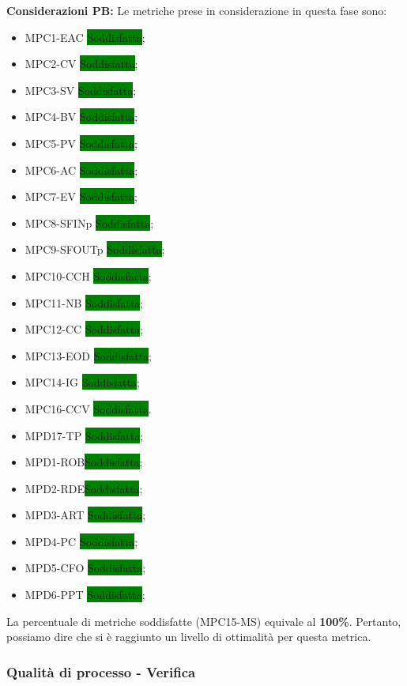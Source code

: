 \bigskip
\noindent \textbf{Considerazioni PB:}
Le metriche prese in considerazione in questa fase sono:
\begin{itemize}
    \item MPC1-EAC \colorbox{green}{Soddisfatta};
    \item MPC2-CV \colorbox{green}{Soddisfatta};
    \item MPC3-SV \colorbox{green}{Soddisfatta};
    \item MPC4-BV \colorbox{green}{Soddisfatta};
    \item MPC5-PV \colorbox{green}{Soddisfatta};
    \item MPC6-AC \colorbox{green}{Soddisfatta};
    \item MPC7-EV \colorbox{green}{Soddisfatta};
    \item MPC8-SFINp \colorbox{green}{Soddisfatta};
    \item MPC9-SFOUTp \colorbox{green}{Soddisfatta};
    \item MPC10-CCH \colorbox{green}{Soddisfatta};
    \item MPC11-NB \colorbox{green}{Soddisfatta};
    \item MPC12-CC \colorbox{green}{Soddisfatta};
    \item MPC13-EOD \colorbox{green}{Soddisfatta};
    \item MPC14-IG \colorbox{green}{Soddisfatta};
    \item MPC16-CCV \colorbox{green}{Soddisfatta}.
    \item MPD17-TP \colorbox{green}{Soddisfatta};
    \item MPD1-ROB\colorbox{green}{Soddisfatta};
    \item MPD2-RDE\colorbox{green}{Soddisfatta};
    \item MPD3-ART \colorbox{green}{Soddisfatta};
    \item MPD4-PC \colorbox{green}{Soddisfatta};
    \item MPD5-CFO \colorbox{green}{Soddisfatta};
    \item MPD6-PPT \colorbox{green}{Soddisfatta};
\end{itemize}
\noindent La percentuale di metriche soddisfatte (MPC15-MS) equivale al \textbf{100\%}. Pertanto, possiamo dire che si è raggiunto un livello di ottimalità per questa metrica.

\newpage

\subsubsection{Qualità di processo - Verifica}
